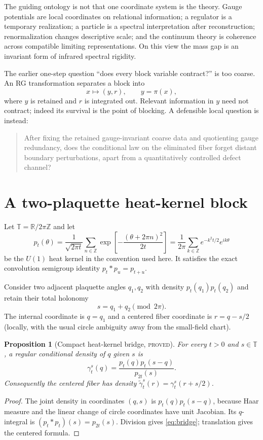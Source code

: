 \documentclass[11pt]{article}
\newcommand{\proved}{\textcolor{provedgreen}{\textsc{proved}}}
\newcommand{\R}{\mathbb R}
\newcommand{\T}{\mathbb T}
\newtheorem{proposition}[definition]{Proposition}
\theoremstyle{remark}
\begin{document}
The guiding ontology is not that one coordinate system is the theory.  Gauge
potentials are local coordinates on relational information; a regulator is a
temporary realization; a particle is a spectral interpretation after
reconstruction; renormalization changes descriptive scale; and the continuum
theory is coherence across compatible limiting representations.  On this view
the mass gap is an invariant form of infrared spectral rigidity.

The earlier one-step question ``does every block variable contract?'' is too
coarse.  An RG transformation separates a block into
\[
   x \longmapsto (y,r), \qquad y=\pi(x),
\]
where $y$ is retained and $r$ is integrated out.  Relevant information in $y$
need not contract; indeed its survival is the point of blocking.  A defensible
local question is instead:
\begin{quote}
After fixing the retained gauge-invariant coarse data and quotienting gauge
redundancy, does the conditional law on the eliminated fiber forget distant
boundary perturbations, apart from a quantitatively controlled defect channel?
\end{quote}

\section{A two-plaquette heat-kernel block}

Let $\T=\R/2\pi\mathbb Z$ and let
\[
 p_t(\theta)=\frac{1}{\sqrt{2\pi t}}
 \sum_{n\in\mathbb Z}\exp\!\left[-\frac{(\theta+2\pi n)^2}{2t}\right]
 =\frac1{2\pi}\sum_{k\in\mathbb Z}e^{-k^2t/2}e^{ik\theta}
\]
be the $U(1)$ heat kernel in the convention used here.  It satisfies the exact
convolution semigroup identity $p_t*p_u=p_{t+u}$.

Consider two adjacent plaquette angles $q_1,q_2$ with density
$p_t(q_1)p_t(q_2)$ and retain their total holonomy
\[
 s=q_1+q_2\pmod{2\pi}.
\]
The internal coordinate is $q=q_1$ and a centered fiber coordinate is
$r=q-s/2$ (locally, with the usual circle ambiguity away from the small-field
chart).

\begin{proposition}[Compact heat-kernel bridge, \proved]
For every $t>0$ and $s\in\T$, a regular conditional density of $q$ given $s$
is
\begin{equation}\label{eq:bridge}
 \gamma_t^s(q)=\frac{p_t(q)p_t(s-q)}{p_{2t}(s)}.
\end{equation}
Consequently the centered fiber has density
$\widetilde\gamma_t^s(r)=\gamma_t^s(r+s/2)$.
\end{proposition}
\begin{proof}
The joint density in coordinates $(q,s)$ is $p_t(q)p_t(s-q)$, because Haar
measure and the linear change of circle coordinates have unit Jacobian.  Its
$q$-integral is $(p_t*p_t)(s)=p_{2t}(s)$.  Division gives
\eqref{eq:bridge}; translation gives the centered formula.
\end{proof}
\end{document}
